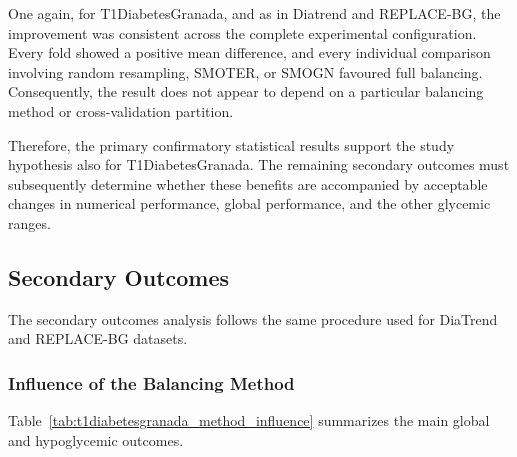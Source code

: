 One again, for T1DiabetesGranada, and as in Diatrend and REPLACE-BG, the improvement was consistent across the complete experimental configuration. Every fold showed a positive mean difference, and every individual comparison involving random resampling, SMOTER, or SMOGN favoured full balancing. Consequently, the result does not appear to depend on a particular balancing method or cross-validation partition.

Therefore, the primary confirmatory statistical results support the study hypothesis also for T1DiabetesGranada. The remaining secondary outcomes must subsequently determine whether these benefits are accompanied by acceptable changes in numerical performance, global performance, and the other glycemic ranges.

\subsection{Secondary Outcomes}
\label{subsec:t1diabetesgranadasecondary_outcomes}

The secondary outcomes analysis follows the same procedure used for DiaTrend and REPLACE-BG datasets.

\subsubsection{Influence of the Balancing Method}
\label{subsubsec:t1diabetesgranadamethod_influence}

Table~\ref{tab:t1diabetesgranada_method_influence} summarizes the main global and hypoglycemic outcomes.

\begin{table}[htbp]
    \centering
    \caption{Main T1DiabetesGranada results.}
    \label{tab:t1diabetesgranada_method_influence}
\end{table}

